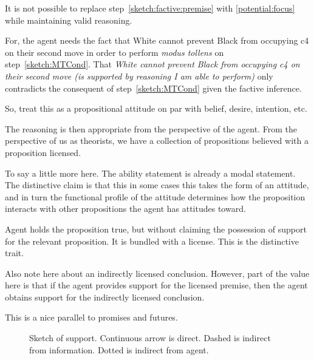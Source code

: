 \documentclass[10pt]{article}
\begin{document}
It is not possible to replace step~\ref{sketch:factive:premise} with \ref{potential:focus} while maintaining valid reasoning.

For, the agent needs the fact that White cannot prevent Black from occupying c4 on their second move in order to perform \emph{modus tollens} on step~\ref{sketch:MTCond}.
That \emph{White cannot prevent Black from occupying c4 on their second move (is supported by reasoning I am able to perform)} only contradicts the consequent of step~\ref{sketch:MTCond} given the factive inference.



So, treat this as a propositional attitude on par with belief, desire, intention, etc.



The reasoning is then appropriate from the perspective of the agent.
From the perspective of us as theorists, we have a collection of propositions believed with a proposition licensed.


To say a little more here.
The ability statement is already a modal statement.
The distinctive claim is that this in some cases this takes the form of an attitude, and in turn the functional profile of the attitude determines how the proposition interacts with other propositions the agent has attitudes toward.


Agent holds the proposition true, but without claiming the possession of support for the relevant proposition.
It is bundled with a license.
This is the distinctive trait.

\begin{note}
  Also note here about an indirectly licensed conclusion.
  However, part of the value here is that if the agent provides support for the licensed premise, then the agent obtains support for the indirectly licensed conclusion.

  This is a nice parallel to promises and futures.
\end{note}

\begin{figure}[h]
  \centering
\caption{Sketch of support.
  Continuous arrow is direct.
  Dashed is indirect from information.
  Dotted is indirect from agent.}
\label{fig:dynamics}
\end{figure}
\end{document}
